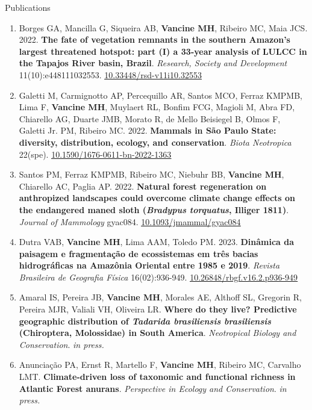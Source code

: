 \documentclass{resume}
\begin{document}
\begin{rSection}{Publications}
\begin{enumerate}
\item Borges GA, Mancilla G, Siqueira AB, {\bf Vancine MH}, Ribeiro MC, Maia JCS. 2022. {\bf The fate of vegetation remnants in the southern Amazon’s largest threatened hotspot: part (I) a 33-year analysis of LULCC in the Tapajos River basin, Brazil}. {\it Research, Society and Development} 11(10):e448111032553. \href{https://doi.org/10.33448/rsd-v11i10.32553}{\underline{10.33448/rsd-v11i10.32553}}

\item Galetti M, Carmignotto AP, Percequillo AR, Santos MCO, Ferraz KMPMB, Lima F, {\bf Vancine MH}, Muylaert RL, Bonfim FCG, Magioli M, Abra FD, Chiarello AG, Duarte JMB, Morato R, de Mello Beisiegel B, Olmos F, Galetti Jr. PM, Ribeiro MC. 2022. {\bf Mammals in São Paulo State: diversity, distribution, ecology, and conservation}. {\it Biota Neotropica} 22(spe). \href{https://doi.org/10.1590/1676-0611-bn-2022-1363}{\underline{10.1590/1676-0611-bn-2022-1363}}

\item Santos PM, Ferraz KMPMB, Ribeiro MC, Niebuhr BB, {\bf Vancine MH}, Chiarello AC, Paglia AP. 2022. {\bf Natural forest regeneration on anthropized landscapes could overcome climate change effects on the endangered maned sloth ({\it Bradypus torquatus}, Illiger 1811)}. {\it Journal of Mammology} gyac084. \href{https://doi.org/10.1093/jmammal/gyac084}{\underline{10.1093/jmammal/gyac084}}

\item Dutra VAB, {\bf Vancine MH}, Lima AAM, Toledo PM. 2023. {\bf Dinâmica da paisagem e fragmentação de ecossistemas em três bacias hidrográficas na Amazônia Oriental entre 1985 e 2019}. {\it Revista Brasileira de Geografia Física} 16(02):936-949. \href{https://doi.org/10.26848/rbgf.v16.2.p936-949}{\underline{10.26848/rbgf.v16.2.p936-949}}

\item Amaral IS, Pereira JB, {\bf Vancine MH}, Morales AE, Althoff SL, Gregorin R, Pereira MJR, Valiali VH, Oliveira LR. {\bf Where do they live? Predictive geographic distribution of {\it Tadarida brasiliensis brasiliensis} (Chiroptera, Molossidae) in South America}. {\it Neotropical Biology and Conservation}. {\it in press.}

\item Anunciação PA, Ernst R, Martello F, {\bf Vancine MH}, Ribeiro MC, Carvalho LMT. {\bf Climate-driven loss of taxonomic and functional richness in Atlantic Forest anurans}. {\it Perspective in Ecology and Conservation}. {\it in press.}


\end{enumerate}
\end{rSection}
\end{document}
